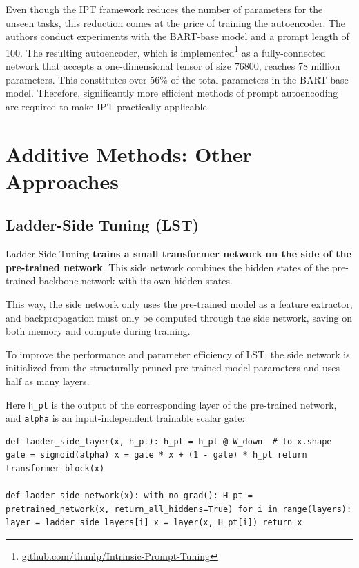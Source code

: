 Even though the IPT framework reduces the number of parameters for the unseen tasks, this reduction comes at the price of training the autoencoder. The authors conduct experiments with the BART-base model and a prompt length of 100. The resulting autoencoder, which is implemented\footnote{\href{https://github.com/thunlp/Intrinsic-Prompt-Tuning/blob/master/bartPrompt.py}{github.com/thunlp/Intrinsic-Prompt-Tuning}} as a fully-connected network that accepts a one-dimensional tensor of size $76800$, reaches 78 million parameters. This constitutes over 56\% of the total parameters in the BART-base model. Therefore, significantly more efficient methods of prompt autoencoding are required to make IPT practically applicable.

\section{Additive Methods: Other Approaches}
\label{sec:additive_section_others}

\subsection{Ladder-Side Tuning (LST)}
\label{sec:lst}

Ladder-Side Tuning \citep{ladder_side_tuning} \textbf{trains a small transformer network on the side of the pre-trained network}. This side network combines the hidden states of the pre-trained backbone network with its own hidden states.

This way, the side network only uses the pre-trained model as a feature extractor, and backpropagation must only be computed through the side network, saving on both memory and compute during training.

To improve the performance and parameter efficiency of LST, the side network is initialized from the structurally pruned pre-trained model parameters and uses half as many layers.

Here \texttt{h\_pt} is the output of the corresponding layer of the pre-trained network, and \texttt{alpha} is an input-independent trainable scalar gate:

\begin{lstlisting}
def ladder_side_layer(x, h_pt): h_pt = h_pt @ W_down  # to x.shape gate = sigmoid(alpha) x = gate * x + (1 - gate) * h_pt return transformer_block(x)

def ladder_side_network(x): with no_grad(): H_pt = pretrained_network(x, return_all_hiddens=True) for i in range(layers): layer = ladder_side_layers[i] x = layer(x, H_pt[i]) return x
\end{lstlisting}

